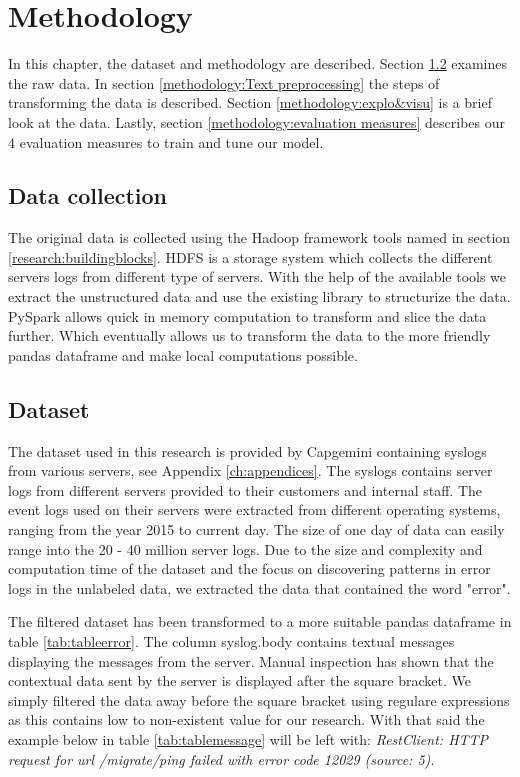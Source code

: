 \chapter{Methodology}  \label{ch:methodology}

In this chapter, the dataset and methodology are described. Section \ref{methodology:dataset} examines the raw data. In section \ref{methodology:Text preprocessing} the steps of transforming the data is described. Section \ref{methodology:explo&visu} is a brief look at the data. Lastly, section \ref{methodology:evaluation measures} describes our 4 evaluation measures to train and tune our model.

\section{Data collection}
The original data is collected using the Hadoop framework tools named in section \ref{research:buildingblocks}. HDFS is a storage system which collects the different servers logs from different type of servers. With the help of the available tools we extract the unstructured data and use the existing library to structurize the data. PySpark allows quick in memory computation to transform and slice the data further. Which eventually allows us to transform the data to the more friendly pandas dataframe and make local computations possible.  
 
\section{Dataset}\label{methodology:dataset}
The dataset used in this research is provided by Capgemini containing syslogs from various servers, see Appendix \ref{ch:appendices}. The syslogs contains server logs from different servers provided to their customers and internal staff. The event logs used on their servers were extracted from different operating systems, ranging from the year 2015 to current day. The size of one day of data can easily range into the 20 - 40 million server logs. Due to the size and complexity and computation time of the dataset and the focus on discovering patterns in error logs in the unlabeled data, we extracted the data that contained the word "error". 

The filtered dataset has been transformed to a more suitable pandas dataframe in table \ref{tab:tableerror}. The column syslog.body contains textual messages displaying the messages from the server. Manual inspection has shown that the contextual data sent by the server is displayed after the square bracket. We simply filtered the data away before the square bracket using regulare expressions as this contains low to non-existent value for our research. 
With that said the example below in table \ref{tab:tablemessage} will be left with: \textit{RestClient: HTTP request for url /migrate/ping failed with error code 12029 (source: 5).} 

